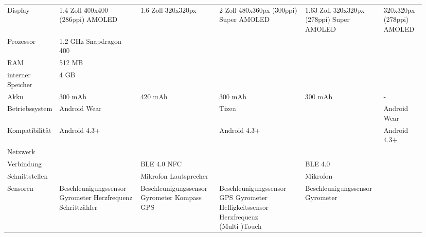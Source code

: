 \begin{landscape}
\begin{longtable}{p{3cm}p{4cm}p{4cm}p{4cm}p{4cm}p{4cm}}
	Display
		& 1.4 Zoll \newline
			400x400 (286ppi) \newline
			AMOLED
		& 1.6 Zoll \newline
			320x320px
		& 2 Zoll \newline
			480x360px (300ppi) \newline
			Super AMOLED
		& 1.63 Zoll \newline
			320x320px (278ppi) \newline
			Super AMOLED
		& \newline
			320x320px (278ppi) \newline
			AMOLED \\
	Prozessor
		& 1.2 GHz \newline
			Snapdragon 400 \\
	RAM
		& 512 MB\\
	interner Speicher
		& 4 GB\\
	Akku
		& 300 mAh
		& 420 mAh 
		& 300 mAh
		& 300 mAh
		& -\\
	Betriebssystem
		& Android Wear
		&
		& Tizen 
		&
		& Android Wear \\
	Kompatibilität
		& Android 4.3+
		&
		& Android 4.3+
		&
		& Android 4.3+ \\
	Netzwerk
		&
		&
		& 
		&
		& \\
	Verbindung
		&
		& BLE 4.0 \newline
			NFC
		&
		& BLE 4.0
		& \\
	Schnittstellen
		&
		& Mikrofon \newline
			Lautsprecher
		&
		& Mikrofon \\
	Sensoren
		& Beschleunigungssensor \newline
			Gyrometer \newline
			Herzfrequenz \newline
			Schrittzähler
		& Beschleunigungssensor \newline
			Gyrometer \newline
			Kompass \newline
			GPS
		& Beschleunigungssensor \newline
			GPS \newline
			Gyrometer \newline
			Helligkeitssensor\newline			
			Herzfrequenz \newline
			(Multi-)Touch
		& Beschleunigungssensor \newline
			Gyrometer \newline

\end{longtable}
\end{landscape}
